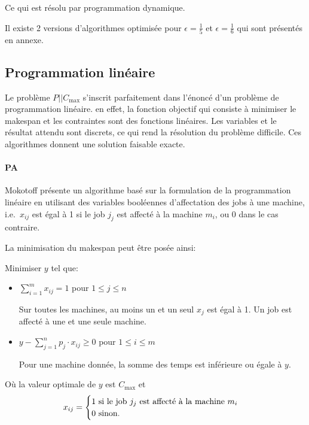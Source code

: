 \documentclass[a4paper,12pt]{report}
\theoremstyle{plain}				%
\theoremstyle{definition}				%
\newcommand\problemGrahamP{$P||C_{\max}$\xspace}
\begin{document}
Ce qui est résolu par programmation dynamique.

Il existe 2 versions d'algorithmes optimisée pour $\epsilon = \frac{1}{5}$ et $\epsilon = \frac{1}{6}$ qui sont présentés en annexe.


\subsection{Programmation linéaire}\label{ssec:programmationLineaire}

Le problème \problemGrahamP s'inscrit parfaitement dans l'énoncé d'un problème de programmation linéaire.
en effet, la fonction objectif qui consiste à minimiser le makespan et les contraintes sont des fonctions linéaires. Les variables et le résultat attendu sont discrets, ce qui rend la résolution du problème difficile. Ces algorithmes donnent une solution faisable exacte.

\paragraph{PA} 
Mokotoff \cite{mokoto1999scheduling} présente un algorithme basé sur
la formulation de la programmation linéaire en utilisant des
variables booléennes d'affectation des jobs à une machine, i.e.\
$x_{ij}$ est égal à 1 si le job $j_j$ est affecté à la machine $m_i$, ou
0 dans le cas contraire.

\bigskip
La minimisation du makespan peut être posée ainsi:

Minimiser $y$ tel que:

\begin{itemize}
\item $\sum_{i=1}^{m}x_{ij}=1$ \quad pour $1 \leq j \leq n$

Sur toutes les machines, au moins un et un seul $x_j$ est égal à 1.
Un job est affecté à une et une seule machine.

\item $y-\sum_{j=1}^{n}p_j \cdot x_{ij} \geq 0$ \quad pour $1 \leq i \leq m$

Pour une machine donnée, la somme des temps est inférieure ou égale à $y$.
\end{itemize}

\bigskip
Où la valeur optimale de $y$ est $C_{\max}$
et
\[
  x_{ij} =
  \begin{cases}
    1 \textnormal{ si le job $j_j$ est affecté à la machine $m_i$}\\
    0 \textnormal{ sinon.}\\
  \end{cases}
\]
\end{document}
